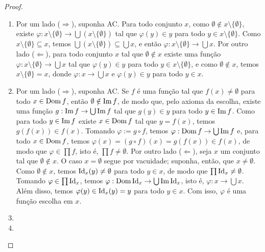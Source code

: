 \begin{proof}
    \leavevmode
        \begin{enumerate}[leftmargin=*, align=left, label=\textbf{(\alph*)}]
            \item Por um lado ($\Rightarrow$), suponha \textsf{AC}. Para todo conjunto $x$, como $\emptyset \notin x \setminus \{\emptyset \}$, existe $\varphi : x \setminus \{\emptyset \} \to \bigcup (x \setminus \{\emptyset \})$ tal que $\varphi(y) \in y$ para todo $y \in x \setminus \{\emptyset \}$. Como $x \setminus \{\emptyset \} \subseteq x$, temos $\bigcup (x \setminus \{\emptyset \}) \subseteq \bigcup x$, e então $\varphi : x \setminus \{\emptyset \} \to \bigcup x$. Por outro lado ($\Leftarrow$), para todo conjunto $x$ tal que $\emptyset \notin x$ existe uma função $\varphi : x \setminus \{\emptyset\} \to \bigcup x$ tal que $\varphi(y) \in y$ para todo $y \in x \setminus \{\emptyset\}$, e como $\emptyset \notin x$, temos $x \setminus \{\emptyset\} = x$, donde $\varphi : x \to \bigcup x$ e $\varphi(y) \in y$ para todo $y \in x$. \blackproof
            \item Por um lado ($\Rightarrow$), suponha \textsf{AC}. Se $f$ é uma função tal que $f(x) \neq \emptyset$ para todo $x \in \operatorname{Dom} f$, então $\emptyset \notin \operatorname{Im} f$, de modo que, pelo axioma da escolha, existe uma função $g: \operatorname{Im} f \to \bigcup \operatorname{Im} f$ tal que $g(y) \in y$ para todo $y \in \operatorname{Im} f$. Como para todo $y \in \operatorname{Im} f$ existe $x \in \operatorname{Dom} f$ tal que $y=f(x)$, temos $g(f(x)) \in f(x)$. Tomando $\varphi := g \circ f$, temos $\varphi : \operatorname{Dom} f \to \bigcup \operatorname{Im} f$ e, para todo $x \in \operatorname{Dom} f$, temos $\varphi(x) = (g \circ f)(x) = g(f(x)) \in f(x)$, de modo que $\varphi \in \prod f$, isto é, $\prod f \neq \emptyset$. Por outro lado ($\Leftarrow$), seja $x$ um conjunto tal que $\emptyset \notin x$. O caso $x = \emptyset$ segue por vacuidade; suponha, então, que $x \neq \emptyset$. Como $\emptyset \notin x$, temos $\operatorname{Id}_{x}(y) \neq \emptyset$ para todo $y \in x$, de modo que $\prod \operatorname{Id}_{x} \neq \emptyset$. Tomando $\varphi \in \prod \operatorname{Id}_{x}$, temos $\varphi : \operatorname{Dom} \operatorname{Id}_{x} \to \bigcup \operatorname{Im} \operatorname{Id}_{x}$, isto é, $\varphi : x \to \bigcup x$. Além disso, temos $\varphi(y) \in \operatorname{Id}_{x}(y) = y$ para todo $y \in x$. Com isso, $\varphi$ é uma função escolha em $x$. \blackproof
            \item \blackproof
            \item \blackproof
        \end{enumerate}
\end{proof}


